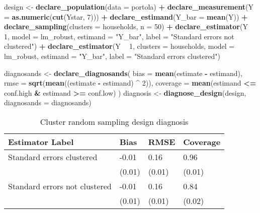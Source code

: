\documentclass[
]{article}
\newenvironment{Shaded}{\begin{snugshade}}{\end{snugshade}}
\newcommand{\DataTypeTok}[1]{\textcolor[rgb]{0.13,0.29,0.53}{#1}}
\newcommand{\DecValTok}[1]{\textcolor[rgb]{0.00,0.00,0.81}{#1}}
\newcommand{\KeywordTok}[1]{\textcolor[rgb]{0.13,0.29,0.53}{\textbf{#1}}}
\newcommand{\NormalTok}[1]{#1}
\newcommand{\OperatorTok}[1]{\textcolor[rgb]{0.81,0.36,0.00}{\textbf{#1}}}
\newcommand{\StringTok}[1]{\textcolor[rgb]{0.31,0.60,0.02}{#1}}
\begin{document}
\begin{Shaded}
\begin{Highlighting}[]
\NormalTok{design <-}
\StringTok{  }\KeywordTok{declare_population}\NormalTok{(}\DataTypeTok{data =}\NormalTok{ portola) }\OperatorTok{+}
\StringTok{  }\KeywordTok{declare_measurement}\NormalTok{(}\DataTypeTok{Y =} \KeywordTok{as.numeric}\NormalTok{(}\KeywordTok{cut}\NormalTok{(Ystar, }\DecValTok{7}\NormalTok{))) }\OperatorTok{+}
\StringTok{  }\KeywordTok{declare_estimand}\NormalTok{(}\DataTypeTok{Y_bar =} \KeywordTok{mean}\NormalTok{(Y)) }\OperatorTok{+}
\StringTok{  }\KeywordTok{declare_sampling}\NormalTok{(}\DataTypeTok{clusters =}\NormalTok{ households, }\DataTypeTok{n =} \DecValTok{50}\NormalTok{) }\OperatorTok{+}
\StringTok{  }\KeywordTok{declare_estimator}\NormalTok{(Y }\OperatorTok{~}\StringTok{ }\DecValTok{1}\NormalTok{,}
                    \DataTypeTok{model =}\NormalTok{ lm_robust,}
                    \DataTypeTok{estimand =} \StringTok{"Y_bar"}\NormalTok{,}
                    \DataTypeTok{label =} \StringTok{"Standard errors not clustered"}\NormalTok{) }\OperatorTok{+}
\StringTok{  }\KeywordTok{declare_estimator}\NormalTok{(Y }\OperatorTok{~}\StringTok{ }\DecValTok{1}\NormalTok{,}
                    \DataTypeTok{clusters =}\NormalTok{ households,}
                    \DataTypeTok{model =}\NormalTok{ lm_robust,}
                    \DataTypeTok{estimand =} \StringTok{"Y_bar"}\NormalTok{,}
                    \DataTypeTok{label =} \StringTok{"Standard errors clustered"}\NormalTok{)}

\NormalTok{diagnosands <-}\StringTok{ }\KeywordTok{declare_diagnosands}\NormalTok{(}
  \DataTypeTok{bias =} \KeywordTok{mean}\NormalTok{(estimate }\OperatorTok{-}\StringTok{ }\NormalTok{estimand),}
  \DataTypeTok{rmse =} \KeywordTok{sqrt}\NormalTok{(}\KeywordTok{mean}\NormalTok{((estimate }\OperatorTok{-}\StringTok{ }\NormalTok{estimand) }\OperatorTok{^}\StringTok{ }\DecValTok{2}\NormalTok{)),}
  \DataTypeTok{coverage =} \KeywordTok{mean}\NormalTok{(estimand }\OperatorTok{<=}\StringTok{ }\NormalTok{conf.high }\OperatorTok{&}\StringTok{ }\NormalTok{estimand }\OperatorTok{>=}\StringTok{ }\NormalTok{conf.low)}
\NormalTok{)}
\NormalTok{diagnosis <-}\StringTok{ }\KeywordTok{diagnose_design}\NormalTok{(design, }\DataTypeTok{diagnosands =}\NormalTok{ diagnosands) }
\end{Highlighting}
\end{Shaded}

\begin{table}

\caption{\label{tab:clusterrandomsampling}Cluster random sampling design diagnosis}
\centering
\begin{tabular}[t]{llll}
\toprule
Estimator Label & Bias & RMSE & Coverage\\
\midrule
Standard errors clustered & -0.01 & 0.16 & 0.96\\
 & (0.01) & (0.01) & (0.01)\\
Standard errors not clustered & -0.01 & 0.16 & 0.84\\
 & (0.01) & (0.01) & (0.02)\\
\bottomrule
\end{tabular}
\end{table}
\end{document}

